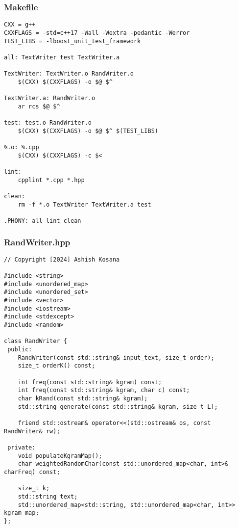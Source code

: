 \documentclass[12pt]{article}
\begin{document}
\subsubsection{Makefile}
\begin{lstlisting}[style=cppcode]
CXX = g++
CXXFLAGS = -std=c++17 -Wall -Wextra -pedantic -Werror
TEST_LIBS = -lboost_unit_test_framework

all: TextWriter test TextWriter.a

TextWriter: TextWriter.o RandWriter.o
	$(CXX) $(CXXFLAGS) -o $@ $^

TextWriter.a: RandWriter.o
	ar rcs $@ $^

test: test.o RandWriter.o
	$(CXX) $(CXXFLAGS) -o $@ $^ $(TEST_LIBS)

%.o: %.cpp
	$(CXX) $(CXXFLAGS) -c $<

lint:
	cpplint *.cpp *.hpp

clean:
	rm -f *.o TextWriter TextWriter.a test

.PHONY: all lint clean
\end{lstlisting}
\subsubsection{RandWriter.hpp}
\begin{lstlisting}[style=cppcode]
// Copyright [2024] Ashish Kosana

#include <string>
#include <unordered_map>
#include <unordered_set>
#include <vector>
#include <iostream>
#include <stdexcept>
#include <random>

class RandWriter {
 public:
    RandWriter(const std::string& input_text, size_t order);
    size_t orderK() const;

    int freq(const std::string& kgram) const;
    int freq(const std::string& kgram, char c) const;
    char kRand(const std::string& kgram);
    std::string generate(const std::string& kgram, size_t L);

    friend std::ostream& operator<<(std::ostream& os, const RandWriter& rw);

 private:
    void populateKgramMap();
    char weightedRandomChar(const std::unordered_map<char, int>& charFreq) const;

    size_t k;
    std::string text;
    std::unordered_map<std::string, std::unordered_map<char, int>> kgram_map;
};
\end{lstlisting}
\end{document}
